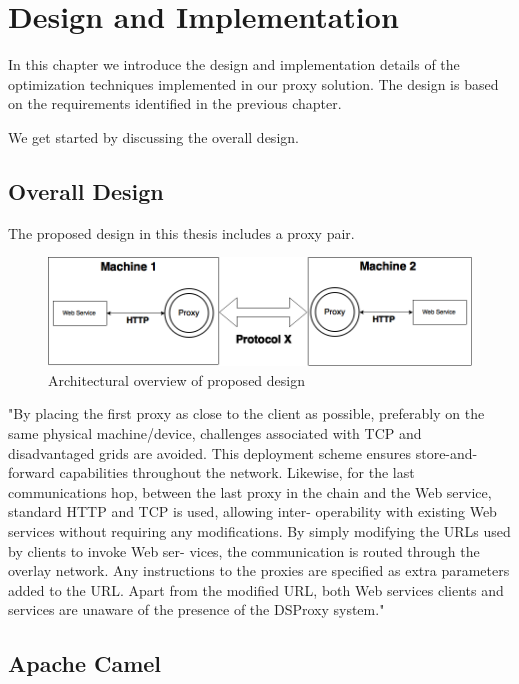 \chapter{Design and Implementation}
\label{chapter:design}

In this chapter we introduce the design and implementation details of the
optimization techniques implemented in our proxy solution. The design is based on the requirements identified in the previous chapter.

We get started by discussing the overall design.

\section{Overall Design}

The proposed design in this thesis includes a proxy pair.

\begin{figure}[h]
\includegraphics[scale=0.4]{images/architecture.png}
\caption{Architectural overview of proposed design}
\end{figure}


"By placing the first proxy as close to the client
as possible, preferably on the same physical
machine/device, challenges associated with TCP
and disadvantaged grids are avoided. This
deployment scheme ensures store-and-forward
capabilities throughout the network. Likewise,
for the last communications hop, between the
last proxy in the chain and the Web service,
standard HTTP and TCP is used, allowing inter-
operability with existing Web services without
requiring any modifications. By simply modifying
the URLs used by clients to invoke Web ser-
vices, the communication is routed through the
overlay network. Any instructions to the proxies
are specified as extra parameters added to the
URL. Apart from the modified URL, both Web
services clients and services are unaware of the
presence of the DSProxy system."

\section{Apache Camel}

